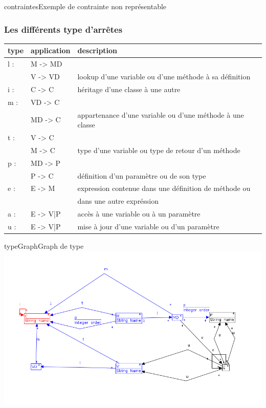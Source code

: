 \documentclass[a4paper, 12pt]{article}
\begin{document}
\begin{figu}{contraintes}{Exemple de contrainte non représentable}
\subsubsection{Les différents type d'arrêtes}
  \begin{tabular}{ | l | l |  l |}
    \hline type & application & description  \\ \hline
    l : & M -> MD & \\ & V -> VD & lookup d'une variable ou d'une méthode à sa définition \\ \hline
    i : & C -> C &  héritage d'une classe à une autre  \\ \hline
    m : & VD -> C & \\ & MD -> C & appartenance d'une variable ou d'une méthode à une classe  \\ \hline
    t : & V -> C  & \\ &  M -> C & type d'une variable ou type de retour d'un méthode   \\ \hline
    p : & MD -> P  & \\ &  P -> C & définition d'un paramètre ou de son type     \\ \hline
    e : & E -> M & expression contenue dans une définition de méthode ou \\ & &  dans une autre expréssion    \\ \hline
    a : & E -> {V|P} & accès à une variable ou à un paramètre    \\ \hline
    u : & E -> {V|P} & mise à jour d'une variable ou d'un paramètre    \\ \hline
   \end{tabular}

\begin{myfig}{typeGraph}{Graph de type}
\includegraphics[width=\textwidth]{typeGraph.png}
\end{myfig}


\end{figu}
\end{document}
